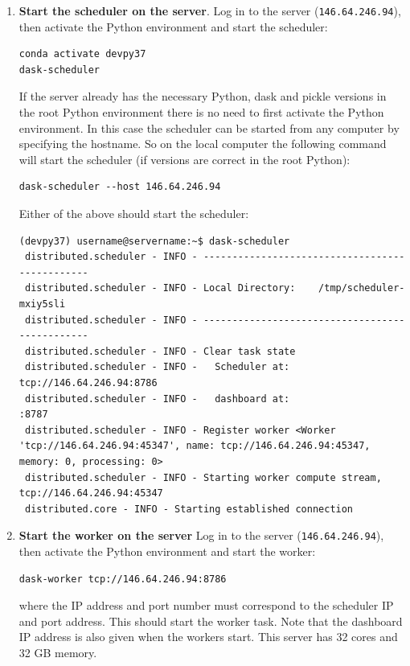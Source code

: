 \begin{enumerate}
\item \textbf{Start the scheduler on the server}. Log in to the server (\lstinline{146.64.246.94}), then activate the Python environment and start the scheduler:

\begin{lstlisting}
conda activate devpy37
dask-scheduler
\end{lstlisting}

If the server already has the necessary Python, dask and pickle versions in the root Python environment there is no need to first activate the Python environment.  In this case the scheduler can be started from any computer by specifying the hostname. So on the local computer the following command will start the scheduler (if versions are correct in the root Python):

\begin{lstlisting}
dask-scheduler --host 146.64.246.94
\end{lstlisting}

Either of the above should start the scheduler:
\begin{lstlisting}[style=tinysize]
(devpy37) username@servername:~$ dask-scheduler
 distributed.scheduler - INFO - -----------------------------------------------
 distributed.scheduler - INFO - Local Directory:    /tmp/scheduler-mxiy5sli
 distributed.scheduler - INFO - -----------------------------------------------
 distributed.scheduler - INFO - Clear task state
 distributed.scheduler - INFO -   Scheduler at:  tcp://146.64.246.94:8786
 distributed.scheduler - INFO -   dashboard at:                     :8787
 distributed.scheduler - INFO - Register worker <Worker 'tcp://146.64.246.94:45347', name: tcp://146.64.246.94:45347, memory: 0, processing: 0>
 distributed.scheduler - INFO - Starting worker compute stream, tcp://146.64.246.94:45347
 distributed.core - INFO - Starting established connection
\end{lstlisting}

\item \textbf{Start the worker on the server}  Log in to the server (\lstinline{146.64.246.94}), then activate the Python environment and start the worker:        

\begin{lstlisting}
dask-worker tcp://146.64.246.94:8786
\end{lstlisting}

where the IP address and port number must correspond to the scheduler IP and port address. This should start the worker task. Note that the dashboard IP address is also given when the workers start. This server has 32 cores and 32 GB memory.    


\end{enumerate}
